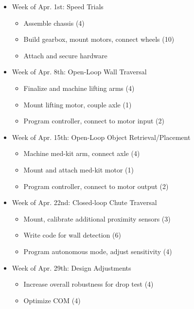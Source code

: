 \documentclass[12pt]{article}
\begin{document}
\begin{itemize}
\item Week of Apr. 1st: Speed Trials 
\begin{itemize}
\item Assemble chassis (4)
\item Build gearbox, mount motors, connect wheels (10)
\item Attach and secure hardware
\end{itemize}
\end{itemize}
\begin{itemize}
\item Week of Apr. 8th: Open-Loop Wall Traversal  
\begin{itemize}
\item Finalize and machine lifting arms (4)
\item Mount lifting motor, couple axle (1)
\item Program controller, connect to motor input (2)
\end{itemize}
\end{itemize}
\begin{itemize}
\item Week of Apr. 15th: Open-Loop Object Retrieval/Placement  
\begin{itemize}
\item Machine med-kit arm, connect axle (4)
\item Mount and attach med-kit motor (1)
\item Program controller, connect to motor output (2)
\end{itemize}
\end{itemize}
\begin{itemize}
\item Week of Apr. 22nd: Closed-loop Chute Traversal  
\begin{itemize}
\item Mount, calibrate additional proximity sensors (3)
\item Write code for wall detection (6)
\item Program autonomous mode, adjust sensitivity (4)
\end{itemize}
\end{itemize}
\begin{itemize}
\item Week of Apr. 29th: Design Adjustments   
\begin{itemize}
\item Increase overall robustness for drop test (4)
\item Optimize COM (4)
\end{itemize}
\end{itemize}
\end{document}
